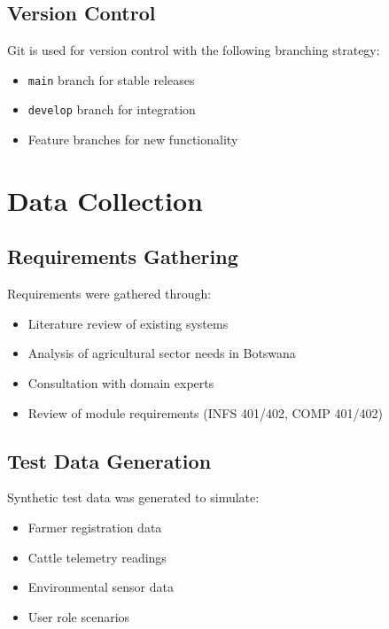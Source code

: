 \subsection{Version Control}

Git is used for version control with the following branching strategy:

\begin{itemize}
    \item \texttt{main} branch for stable releases
    \item \texttt{develop} branch for integration
    \item Feature branches for new functionality
\end{itemize}

\section{Data Collection}

\subsection{Requirements Gathering}

Requirements were gathered through:

\begin{itemize}
    \item Literature review of existing systems
    \item Analysis of agricultural sector needs in Botswana
    \item Consultation with domain experts
    \item Review of module requirements (INFS 401/402, COMP 401/402)
\end{itemize}

\subsection{Test Data Generation}

Synthetic test data was generated to simulate:

\begin{itemize}
    \item Farmer registration data
    \item Cattle telemetry readings
    \item Environmental sensor data
    \item User role scenarios
\end{itemize}

